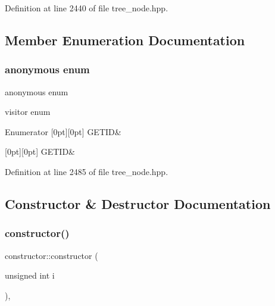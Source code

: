 Definition at line 2440 of file tree\+\_\+node.\+hpp.



\subsection{Member Enumeration Documentation}
\mbox{\label{structconstructor_a58bda1b1cc5faa50c706bc298b025b11}} 
\subsubsection{\texorpdfstring{anonymous enum}{anonymous enum}}
{\footnotesize\ttfamily anonymous enum}



visitor enum 

\begin{DoxyEnumFields}{Enumerator}
[0pt][0pt]{}\mbox{\label{structconstructor_a58bda1b1cc5faa50c706bc298b025b11afca8767786d8cffa6df9916cd78e5cde}} 
G\+E\+T\+ID&\\
\hline

[0pt][0pt]{}\mbox{\label{structconstructor_a58bda1b1cc5faa50c706bc298b025b11afca8767786d8cffa6df9916cd78e5cde}} 
G\+E\+T\+ID&\\
\hline

\end{DoxyEnumFields}


Definition at line 2485 of file tree\+\_\+node.\+hpp.



\subsection{Constructor \& Destructor Documentation}
\mbox{\label{structconstructor_a24bb46e73fa143ab2518ffd5a322991a}} 
\subsubsection{\texorpdfstring{constructor()}{constructor()}}
{\footnotesize\ttfamily constructor\+::constructor (\begin{DoxyParamCaption}\item[{unsigned int}]{i }\end{DoxyParamCaption})\hspace{0.3cm}{\ttfamily [inline]}, {\ttfamily [explicit]}}



